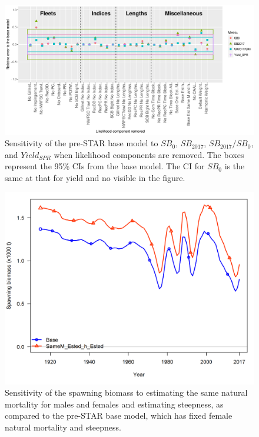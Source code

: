 \documentclass[12pt,]{article}
\begin{document}
\FloatBarrier

\begin{figure}[htbp]
\centering
\includegraphics{Figures/Sensitivity_all.pdf}
\caption{Sensitivity of the pre-STAR base model to \(SB_0\),
\(SB_{2017}\), \(SB_{2017}/SB_0\), and \(Yield_{SPR}\) when likelihood
components are removed. The boxes represent the 95\% CIs from the base
model. The CI for \(SB_0\) is the same at that for yield and no visible
in the figure. \label{fig:Sensitivity_all}}
\end{figure}

\begin{figure}[htbp]
\centering
\includegraphics{Figures/sensitivity_spawnbio.png}
\caption{Sensitivity of the spawning biomass to estimating the same
natural mortality for males and females and estimating steepness, as
compared to the pre-STAR base model, which has fixed female natural
mortality and steepness. \label{fig:sensitivity_spawnbio}}
\end{figure}
\end{document}
